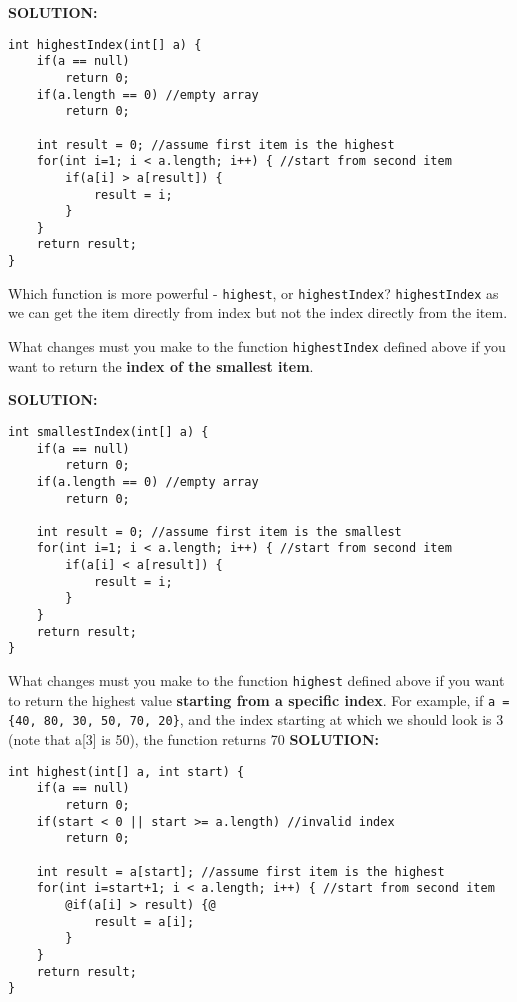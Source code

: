 \documentclass[11pt]{exam}
\begin{document}
\begin{questions}
\ifprintanswers \vskip 1cm \textbf{SOLUTION:} \vskip 1cm
\begin{lstlisting}[numbers=none, frame=single ,style=buggy]
int highestIndex(int[] a) {
	if(a == null)
		return 0;
	if(a.length == 0) //empty array
		return 0;
		
	int result = 0; //assume first item is the highest
	for(int i=1; i < a.length; i++) { //start from second item
		if(a[i] > a[result]) {
			result = i;
		}
	}
	return result;
}	
\end{lstlisting}
\newpage \else
\vskip 8cm
\fi

\question Which function is more powerful - \texttt{highest}, or \texttt{highestIndex}?
\ifprintanswers
\texttt{highestIndex} as we can get the item directly from index but not the index directly from the item.
\newpage
\else 
\vskip 2cm
\fi

\question What changes must you make to the function \texttt{highestIndex} defined above if you want to return the \textbf{index of the smallest item}.

\ifprintanswers \vskip 1cm \textbf{SOLUTION:} \vskip 1cm
\begin{lstlisting}[numbers=none, frame=single ,style=buggy]
int smallestIndex(int[] a) {
	if(a == null)
		return 0;
	if(a.length == 0) //empty array
		return 0;
		
	int result = 0; //assume first item is the smallest
	for(int i=1; i < a.length; i++) { //start from second item
		if(a[i] < a[result]) {
			result = i;
		}
	}
	return result;
}	
\end{lstlisting}
\newpage \else
\newpage
\fi

\question What changes must you make to the function \texttt{highest} defined above if you want to return the highest value \textbf{starting from a specific index}. For example, if \texttt{a = \{40, 80, 30, 50, 70, 20\}}, and the index starting at which we should look is 3 (note that a[3] is 50), the function returns 70
\ifprintanswers \vskip 1cm \textbf{SOLUTION:} \vskip 1cm
\begin{lstlisting}[numbers=none, frame=single ,style=buggy]
int highest(int[] a, int start) {
	if(a == null)
		return 0;
	if(start < 0 || start >= a.length) //invalid index
		return 0;
		
	int result = a[start]; //assume first item is the highest
	for(int i=start+1; i < a.length; i++) { //start from second item
		@if(a[i] > result) {@
			result = a[i];
		}
	}
	return result;
}	
\end{lstlisting}
\newpage \else
\vskip 7cm
\fi


\end{questions}
\end{document}
